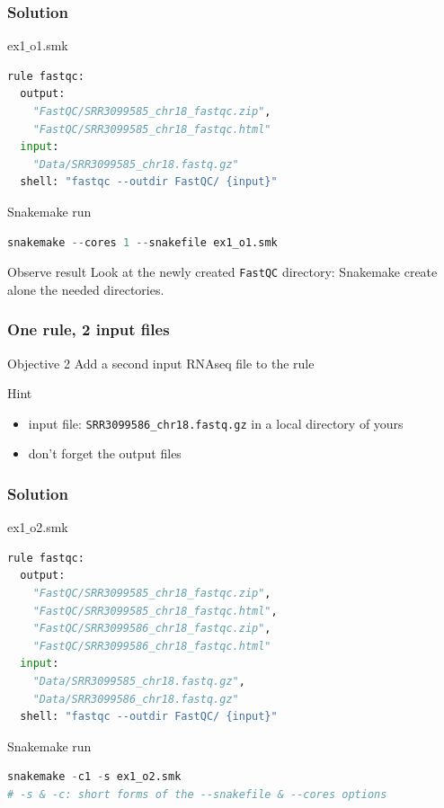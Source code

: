 \begin{frame}[containsverbatim]
\frametitle{Solution}
\begin{exampleblock}{ex1$\_$o1.smk}
\begin{lstlisting}[language=python]
rule fastqc:
  output:
    "FastQC/SRR3099585_chr18_fastqc.zip", 
    "FastQC/SRR3099585_chr18_fastqc.html"
  input:
    "Data/SRR3099585_chr18.fastq.gz"
  shell: "fastqc --outdir FastQC/ {input}"
\end{lstlisting}
\end{exampleblock}
\begin{exampleblock}{Snakemake run}
\begin{lstlisting}[language=python]
snakemake --cores 1 --snakefile ex1_o1.smk
\end{lstlisting}
\end{exampleblock}
\begin{exampleblock}{Observe result}
Look at the newly created \verb|FastQC| directory: Snakemake create alone the needed directories.
\end{exampleblock}
\end{frame}
\begin{frame}[containsverbatim]
\frametitle{One rule, 2 input files}
\begin{exampleblock}{Objective 2}
Add a second input RNAseq file to the rule
\end{exampleblock}
\begin{exampleblock}{Hint}
\begin{itemize}
    \item input file: \verb|SRR3099586_chr18.fastq.gz| in a local directory of yours
    \item don't forget the output files
\end{itemize}
\end{exampleblock}
\end{frame}
\begin{frame}[containsverbatim]
\frametitle{Solution}
\begin{exampleblock}{ex1$\_$o2.smk}
\begin{lstlisting}[language=python]
rule fastqc:
  output:
    "FastQC/SRR3099585_chr18_fastqc.zip", 
    "FastQC/SRR3099585_chr18_fastqc.html",
    "FastQC/SRR3099586_chr18_fastqc.zip", 
    "FastQC/SRR3099586_chr18_fastqc.html"
  input:
    "Data/SRR3099585_chr18.fastq.gz",
    "Data/SRR3099586_chr18.fastq.gz"
  shell: "fastqc --outdir FastQC/ {input}"
\end{lstlisting}
\end{exampleblock}
\begin{exampleblock}{Snakemake run}
\begin{lstlisting}[language=python]
snakemake -c1 -s ex1_o2.smk
# -s & -c: short forms of the --snakefile & --cores options
\end{lstlisting}
\end{exampleblock}
\end{frame}
